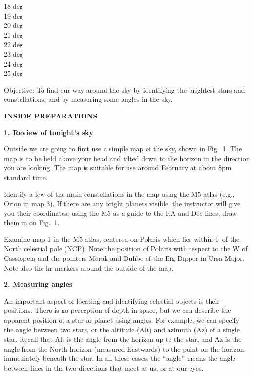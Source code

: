 {\hfill 18$\deg$\makebox[2cm]{\hrulefill} \\
\vspace{-0.028cm}
\hfill 19$\deg$\makebox[2cm]{\hrulefill} \\
\vspace{-0.028cm}
\hfill 20$\deg$\makebox[2cm]{\hrulefill} \\
\vspace{-0.028cm}
\hfill 21$\deg$\makebox[2cm]{\hrulefill} \\
\vspace{-0.028cm}
\hfill 22$\deg$\makebox[2cm]{\hrulefill} \\
\vspace{-0.028cm}
\hfill 23$\deg$\makebox[2cm]{\hrulefill} \\
\vspace{-0.028cm}
\hfill 24$\deg$\makebox[2cm]{\hrulefill} \\
\vspace{-0.028cm}
\hfill 25$\deg$\makebox[2cm]{\hrulefill} \\
}


\bigskip

\noindent
{Objective:} To find our way around the sky by identifying the
brightest stars and constellations, and by measuring some angles
in the sky.

\bigskip\noindent
{\bf INSIDE PREPARATIONS}
\bigskip

\noindent
{\bf 1. Review of tonight's sky}

\medskip
\noindent
Outside we are going to first use a simple map of the sky, shown in
Fig.~1.  The map is to be held above your head and tilted down to the
horizon in the direction you are looking. The map is suitable for use
around February at about 8pm standard time.

Identify a few of the main constellations in the map using the M5
atlas (e.g., Orion in map 3). If there are any bright planets visible,
the instructor will give you their coordinates: using the M5 as a
guide to the RA and Dec lines, draw them in on Fig.~1.

Examine map 1 in the M5 atlas, centered on Polaris which lies within
1\deg\ of the North celestial pole (NCP). Note the position of Polaris
with respect to the W of Cassiopeia and the pointers Merak and Duhbe
of the Big Dipper in Ursa Major. Note also the hr markers around the
outside of the map.

\bigskip
\noindent
{\bf 2. Measuring angles}

\medskip
\noindent
An important aspect of locating and
identifying celestial objects is their positions. There is no
perception of depth in space, but we can describe the apparent
position of a star or planet using angles. For example, we can specify
the angle between two stars, or the altitude (Alt) and azimuth (Az) of
a single star. Recall that Alt is the angle from the horizon up to the
star, and Az is the angle from the North horizon (measured Eastwards)
to the point on the horizon immediately beneath the star. In all these
cases, the ``angle'' means the angle between lines in the two
directions that meet at us, or at our eyes.


